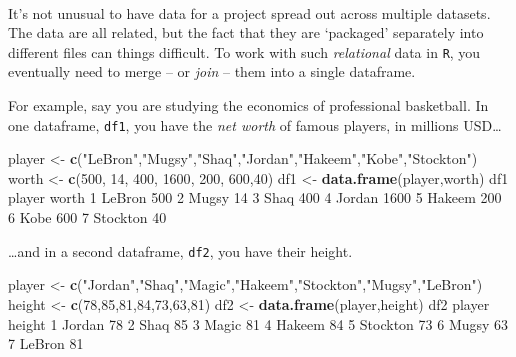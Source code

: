 \documentclass[]{book}
\newenvironment{Shaded}{\begin{snugshade}}{\end{snugshade}}
\newcommand{\DecValTok}[1]{\textcolor[rgb]{0.00,0.00,0.81}{#1}}
\newcommand{\KeywordTok}[1]{\textcolor[rgb]{0.13,0.29,0.53}{\textbf{#1}}}
\newcommand{\NormalTok}[1]{#1}
\newcommand{\StringTok}[1]{\textcolor[rgb]{0.31,0.60,0.02}{#1}}
\begin{document}
~

It's not unusual to have data for a project spread out across multiple datasets. The data are all related, but the fact that they are `packaged' separately into different files can things difficult. To work with such \emph{relational} data in \texttt{R}, you eventually need to merge -- or \emph{join} -- them into a single dataframe.

For example, say you are studying the economics of professional basketball. In one dataframe, \texttt{df1}, you have the \emph{net worth} of famous players, in millions USD\ldots{}

\begin{Shaded}
\begin{Highlighting}[]
\NormalTok{player <-}\StringTok{ }\KeywordTok{c}\NormalTok{(}\StringTok{"LeBron"}\NormalTok{,}\StringTok{"Mugsy"}\NormalTok{,}\StringTok{"Shaq"}\NormalTok{,}\StringTok{"Jordan"}\NormalTok{,}\StringTok{"Hakeem"}\NormalTok{,}\StringTok{"Kobe"}\NormalTok{,}\StringTok{"Stockton"}\NormalTok{)}
\NormalTok{worth <-}\StringTok{ }\KeywordTok{c}\NormalTok{(}\DecValTok{500}\NormalTok{, }\DecValTok{14}\NormalTok{, }\DecValTok{400}\NormalTok{, }\DecValTok{1600}\NormalTok{, }\DecValTok{200}\NormalTok{, }\DecValTok{600}\NormalTok{,}\DecValTok{40}\NormalTok{)}
\NormalTok{df1 <-}\StringTok{ }\KeywordTok{data.frame}\NormalTok{(player,worth)}
\NormalTok{df1}
\NormalTok{    player worth}
\DecValTok{1}\NormalTok{   LeBron   }\DecValTok{500}
\DecValTok{2}\NormalTok{    Mugsy    }\DecValTok{14}
\DecValTok{3}\NormalTok{     Shaq   }\DecValTok{400}
\DecValTok{4}\NormalTok{   Jordan  }\DecValTok{1600}
\DecValTok{5}\NormalTok{   Hakeem   }\DecValTok{200}
\DecValTok{6}\NormalTok{     Kobe   }\DecValTok{600}
\DecValTok{7}\NormalTok{ Stockton    }\DecValTok{40}
\end{Highlighting}
\end{Shaded}

\ldots{}and in a second dataframe, \texttt{df2}, you have their height.

\begin{Shaded}
\begin{Highlighting}[]
\NormalTok{player <-}\StringTok{ }\KeywordTok{c}\NormalTok{(}\StringTok{"Jordan"}\NormalTok{,}\StringTok{"Shaq"}\NormalTok{,}\StringTok{"Magic"}\NormalTok{,}\StringTok{"Hakeem"}\NormalTok{,}\StringTok{"Stockton"}\NormalTok{,}\StringTok{"Mugsy"}\NormalTok{,}\StringTok{"LeBron"}\NormalTok{)}
\NormalTok{height <-}\StringTok{ }\KeywordTok{c}\NormalTok{(}\DecValTok{78}\NormalTok{,}\DecValTok{85}\NormalTok{,}\DecValTok{81}\NormalTok{,}\DecValTok{84}\NormalTok{,}\DecValTok{73}\NormalTok{,}\DecValTok{63}\NormalTok{,}\DecValTok{81}\NormalTok{)}
\NormalTok{df2 <-}\StringTok{ }\KeywordTok{data.frame}\NormalTok{(player,height)}
\NormalTok{df2}
\NormalTok{    player height}
\DecValTok{1}\NormalTok{   Jordan     }\DecValTok{78}
\DecValTok{2}\NormalTok{     Shaq     }\DecValTok{85}
\DecValTok{3}\NormalTok{    Magic     }\DecValTok{81}
\DecValTok{4}\NormalTok{   Hakeem     }\DecValTok{84}
\DecValTok{5}\NormalTok{ Stockton     }\DecValTok{73}
\DecValTok{6}\NormalTok{    Mugsy     }\DecValTok{63}
\DecValTok{7}\NormalTok{   LeBron     }\DecValTok{81}
\end{Highlighting}
\end{Shaded}
\end{document}
